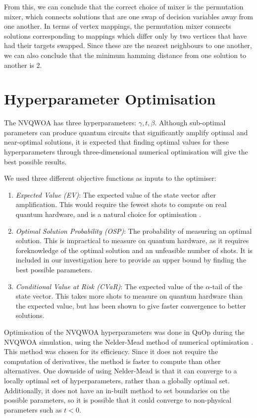 From this, we can conclude that the correct choice of mixer is the permutation mixer, which connects solutions that are one swap of decision variables away from one another. In terms of vertex mappings, the permutation mixer connects solutions corresponding to mappings which differ only by two vertices that have had their targets swapped. Since these are the nearest neighbours to one another, we can also conclude that the minimum hamming distance from one solution to another is 2.

\section{Hyperparameter Optimisation} \label{sec:parameters}
The NVQWOA has three hyperparameters: $\gamma, t, \beta$. Although sub-optimal parameters can produce quantum circuits that significantly amplify optimal and near-optimal solutions, it is expected that finding optimal values for these hyperparameters through three-dimensional numerical optimisation will give the best possible results.\cite{bennett2024analysisnonvariationalquantumwalkbased}
 
We used three different objective functions as inputs to the optimiser:
\begin{enumerate}
    \item \textit{Expected Value (EV)}: The expected value of the state vector after amplification. This would require the fewest shots to compute on real quantum hardware, and is a natural choice for optimisation \cite{cvar_opt}.
    \item \textit{Optimal Solution Probability (OSP)}: The probability of measuring an optimal solution. This is impractical to measure on quantum hardware, as it requires foreknowledge of the optimal solution and an unfeasible number of shots. It is included in our investigation here to provide an upper bound by finding the best possible parameters.
    \item \textit{Conditional Value at Risk (CVaR)}: The expected value of the $\alpha$-tail of the state vector. This takes more shots to measure on quantum hardware than the expected value, but has been shown to give faster convergence to better solutions\cite{CVaR_quantum}.
\end{enumerate}
Optimisation of the NVQWOA hyperparameters was done in QuOp during the NVQWOA simulation, using the Nelder-Mead method of numerical optimisation \cite{nelder_mead}. This method was chosen for its efficiency. Since it does not require the computation of derivatives, the method is faster to compute than other alternatives. One downside of using Nelder-Mead is that it can converge to a locally optimal set of hyperparameters, rather than a globally optimal set. Additionally, it does not have an in-built method to set boundaries on the possible parameters, so it is possible that it could converge to non-physical parameters such as $t<0$.

